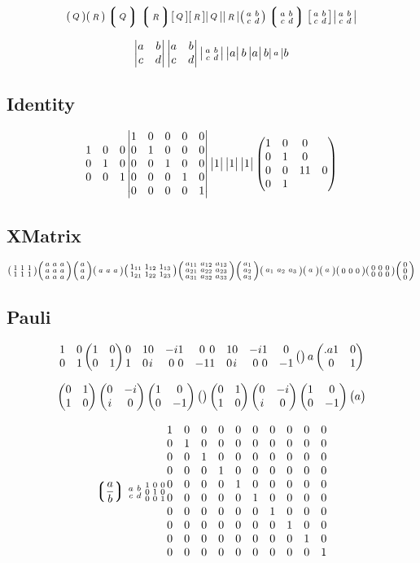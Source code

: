 \documentclass{article}
\begin{document}
\[
  \spmqty{Q} \smqty(R)
  \sPmqty{Q} \smqty*(R)
  \sbmqty{Q} \smqty[R]
  \svmqty{Q} \smqty|R|
  \spmqty{a & b \\ c & d}
  \sPmqty{a & b \\ c & d}
  \sbmqty{a & b \\ c & d}
  \svmqty{a & b \\ c & d}
\]

\[
  \matrixdeterminant{a & b \\ c & d}
  \mdet{a & b \\ c & d}
  \smdet{a & b \\ c & d} 
  \matrixdeterminant a b
  \mdet a b
  \smdet a b
\]

\subsection*{Identity}
\[
  \mqty{\imat{3}}
  \vmqty{\imat{5}}
  \vmqty{\imat{0}}
  \vmqty{\imat{1}}
  \vmqty{\imat{-1}}
  \pmqty{\imat{3}\pmat{0}}
\]

\subsection*{XMatrix}
\[
  \smqty(\xmat{1}{2}{3})
  \smqty(\xmat{a}{3}{3}) 
  \smqty(\xmat{a}{3}{1}) 
  \smqty(\xmat{a}{1}{3})
  \smqty(\xmat*{1}{2}{3})
  \smqty(\xmat*{a}{3}{3})
  \smqty(\xmat*{a}{3}{1})
  \smqty(\xmat*{a}{1}{3})
  \smqty(\xmat*{a}{1}{1})
  \smqty(\xmat*{a}{-1}{-1})
  \smqty(\zmat{1}{3})
  \smqty(\zmat{2}{3})
  \smqty(\zmat{3}{1})
\]


\subsection*{Pauli}
\[
  \mqty{\pmat{0}}
  \pmqty{\pmat{0}}
  \mqty{\pmat{1}}
  \mqty{\pmat{2}}
  \mqty{\pmat{3}}
  \mqty{\pmat{4}}
  \mqty{\pmat{x}}
  \mqty{\pmat{y}}
  \mqty{\pmat{z}}
  \mqty{\pmat{a}}
  \pmqty{\pmat{a}}
  \mqty{\pmat{aa}}
  \pmqty{\pmat{0.a}}
\]

\[
  \pmqty{\pmat{1}}
  \pmqty{\pmat{2}}
  \pmqty{\pmat{3}}
  \pmqty{\pmat{4}}
  \pmqty{\pmat{x}}
  \pmqty{\pmat{y}}
  \pmqty{\pmat{z}}
  \pmqty{\pmat{aa}}
\]


\[
  \left\lgroup\frac{a}{b}\right\rgroup
  \begin{smallmatrix} a & b \\ c & d \end{smallmatrix}
  \smqty{\imat{3}}
  \mqty{\imat{10}}
\]
\end{document}
